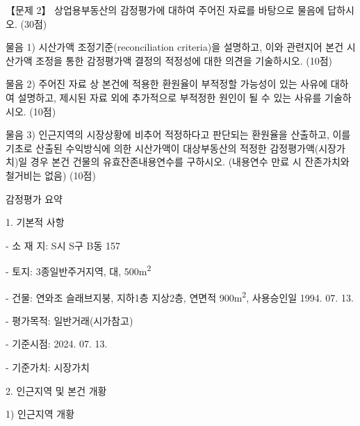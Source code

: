 \begin{longquestion}{【문제 2】}
상업용부동산의 감정평가에 대하여 주어진 자료를 바탕으로 물음에 답하시오. (30점) \par
\medskip\noindent 물음 1) 시산가액 조정기준(reconciliation criteria)을 설명하고, 이와 관련지어 본건 시산가액 조정을 통한 감정평가액 결정의 적정성에 대한 의견을 기술하시오. (10점) \par
\medskip\noindent 물음 2) 주어진 자료 상 본건에 적용한 환원율이 부적정할 가능성이 있는 사유에 대하여 설명하고, 제시된 자료 외에 추가적으로 부적정한 원인이 될 수 있는 사유를 기술하시오. (10점) \par
\medskip\noindent 물음 3) 인근지역의 시장상황에 비추어 적정하다고 판단되는 환원율을 산출하고, 이를 기초로 산출된 수익방식에 의한 시산가액이 대상부동산의 적정한 감정평가액(시장가치)일 경우 본건 건물의 유효잔존내용연수를 구하시오. (내용연수 만료 시 잔존가치와 철거비는 없음) (10점) \par
\medskip{} 감정평가 요약 \par
1. 기본적 사항 \par
\hspace*{0.5em}- 소 재 지: S시 S구 B동 157 \par
\hspace*{0.5em}- 토\hspace{1.2em}지: 3종일반주거지역, 대, 500m\textsuperscript{2} \par
\hspace*{0.5em}- 건\hspace{1.2em}물: 연와조 슬래브지붕, 지하1층 지상2층, 연면적 900m\textsuperscript{2}, 사용승인일 1994. 07. 13. \par
\hspace*{0.5em}- 평가목적: 일반거래(시가참고) \par
\hspace*{0.5em}- 기준시점: 2024. 07. 13. \par
\hspace*{0.5em}- 기준가치: 시장가치 \par
2. 인근지역 및 본건 개황 \par
\hspace*{0.5em}1) 인근지역 개황 \par

\end{longquestion}

